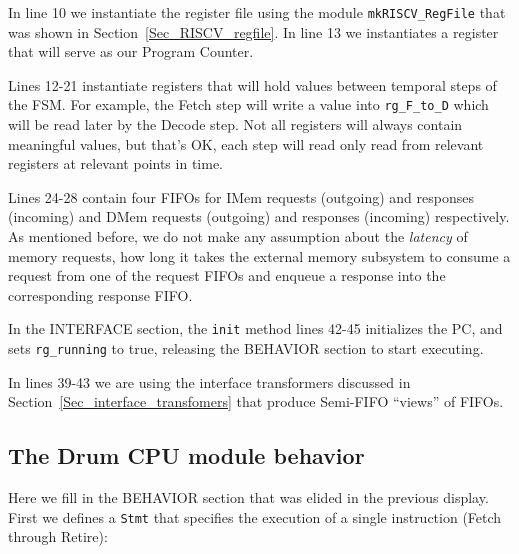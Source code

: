 In line 10 we instantiate the register file using the module
\verb|mkRISCV_RegFile| that was shown in
Section~\ref{Sec_RISCV_regfile}.  In line 13 we instantiates a
register that will serve as our Program Counter.

Lines 12-21 instantiate registers that will hold values between
temporal steps of the FSM.  For example, the Fetch step will write a
value into \verb|rg_F_to_D| which will be read later by the Decode
step.  Not all registers will always contain meaningful values, but
that's OK, each step will read only read from relevant registers at
relevant points in time.

Lines 24-28 contain four FIFOs for IMem requests (outgoing) and
responses (incoming) and DMem requests (outgoing) and responses
(incoming) respectively.  As mentioned before, we do not make any
assumption about the \emph{latency} of memory requests, {\ie} how long
it takes the external memory subsystem to consume a request from one
of the request FIFOs and enqueue a response into the corresponding
response FIFO.

In the INTERFACE section, the \verb|init| method lines 42-45
initializes the PC, and sets \verb|rg_running| to true, releasing the
BEHAVIOR section to start executing.

In lines 39-43 we are using the interface transformers discussed in
Section~\ref{Sec_interface_transfomers} that produce Semi-FIFO
``views'' of FIFOs.


\subsection{The Drum CPU module behavior}

\label{Sec_Drum_CPU_module_behavior}


Here we fill in the BEHAVIOR section that was elided in the previous
display.  First we defines a \verb|Stmt| that specifies the execution
of a single instruction (Fetch through Retire):

